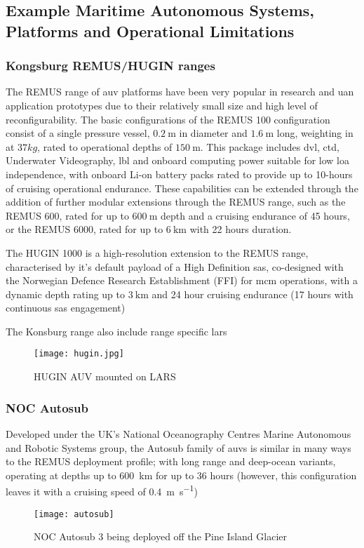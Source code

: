 \subsection{Example Maritime Autonomous Systems, Platforms and Operational Limitations}

\subsubsection{Kongsburg REMUS/HUGIN ranges}

The REMUS range of \gls{auv} platforms have been very popular in research and \gls{uan} application prototypes due to their relatively small size and high level of reconfigurability.
The basic configurations of the REMUS 100 configuration consist of a single pressure vessel, $\SI{0.2}{\meter}$ in diameter and $\SI{1.6}{\meter}$ long, weighting in at $37kg$, rated to operational depths of $\SI{150}{\meter}$. 
This package includes \gls{dvl}, \gls{ctd}, Underwater Videography, \gls{lbl} and onboard computing power suitable for low \gls{loa} independence, with onboard Li-on battery packs rated to provide up to 10-hours of cruising operational endurance.
These capabilities can be extended through the addition of further modular extensions through the REMUS range, such as the REMUS 600, rated for up to $\SI{600}{\meter}$ depth and a cruising endurance of 45 hours, or the REMUS 6000, rated for up to $\SI{6}{\kilo\meter}$ with 22 hours duration.

The HUGIN 1000 is a high-resolution extension to the REMUS range, characterised by it's default payload of a High Definition \gls{sas}, co-designed with the Norwegian Defence Research Establishment (FFI) for \gls{mcm} operations, with a dynamic depth rating up to $\SI{3}{\kilo\meter}$ and 24 hour cruising endurance (17 hours with continuous \gls{sas} engagement)

The Konsburg range also include range specific \gls{lars}
\begin{figure}[h]
	\centering
	\texttt{[image: hugin.jpg]}
	\caption{\label{fig:hugin}HUGIN AUV mounted on LARS}
\end{figure}
\subsubsection{NOC Autosub}

Developed under the UK's National Oceanography Centres Marine Autonomous and Robotic Systems group, the Autosub family of \glspl{auv} is similar in many ways to the REMUS deployment profile; with long range and deep-ocean variants, operating at depths up to \SI{600}{\kilo\meter} for up to 36 hours (however, this configuration leaves it with a cruising speed of \SI{0.4}{\meter\per\second})
\begin{figure}[h]
	\centering
	\texttt{[image: autosub]}
	\caption{\label{fig:autosub}NOC Autosub 3 being deployed off the Pine Island Glacier}
\end{figure}
